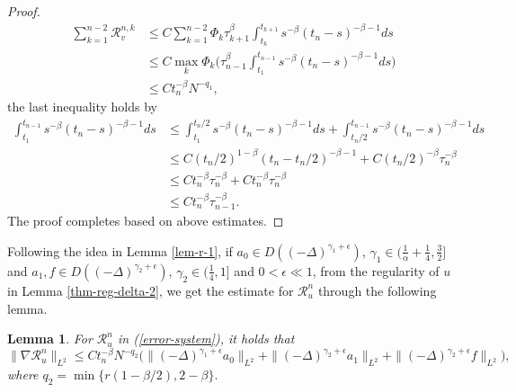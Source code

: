 \documentclass[11pt]{article}
\newtheorem{lemma}{Lemma}[section]
\numberwithin{equation}{section}
\begin{document}
\begin{proof}
\begin{align*}
\sum_{k=1}^{n-2}\mathcal{R}_v^{n,k}
&\le C\sum_{k=1}^{n-2}\Phi_k\tau_{k+1}^\beta \int_{t_k}^{t_{k+1}}s^{-\beta}(t_n-s)^{-\beta-1}ds\\
&\le C\max_k\Phi_k\bigg(\tau_{n-1}^\beta \int_{t_1}^{t_{n-1}}s^{-\beta}(t_n-s)^{-\beta-1}ds\bigg)\\
&\le Ct_n^{-\beta}N^{-q_1},
\end{align*}
the last inequality holds by
\begin{align*}
\int_{t_1}^{t_{n-1}}s^{-\beta}(t_n-s)^{-\beta-1}ds
&\le \int_{t_1}^{t_{n}/2}s^{-\beta}(t_n-s)^{-\beta-1}ds+\int_{t_{n}/2}^{t_{n-1}}s^{-\beta}(t_n-s)^{-\beta-1}ds\\
&\le C(t_n/2)^{1-\beta}(t_n-t_n/2)^{-\beta-1}+C(t_n/2)^{-\beta}\tau_n^{-\beta}\\
&\le Ct_n^{-\beta}\tau_n^{-\beta}+Ct_n^{-\beta}\tau_n^{-\beta}\\
&\le Ct_n^{-\beta}\tau_{n-1}^{-\beta}.
\end{align*}
The proof completes based on above estimates.
\end{proof}

Following the idea in Lemma \ref{lem-r-1}, if $a_0\in D((-\Delta)^{\gamma_1+\epsilon})$, $\gamma_1\in(\frac{1}{\alpha}+\frac14,\frac32]$ and $a_1,f\in D((-\Delta)^{\gamma_2+\epsilon})$, $\gamma_2\in(\frac{1}{4},1]$ and $0<\epsilon \ll 1$, from the regularity of $u$ in Lemma \ref{thm-reg-delta-2}, we get the estimate for $\mathcal{R}_u^n$ through the following lemma.
\begin{lemma}\label{lem-r-2}
For $\mathcal{R}_u^n$ in (\ref{error-system}), it holds that
\[
\|\nabla \mathcal{R}_u^n\|_{L^2} \le Ct_n^{-\beta}N^{-q_2}\Big(\|(-\Delta)^{\gamma_1+\epsilon}a_0\|_{L^2}
+\|(-\Delta)^{\gamma_2+\epsilon}a_1\|_{L^2}+\|(-\Delta)^{\gamma_2+\epsilon}f\|_{L^2}\Big),
\]
where $q_2=\min\{r(1-\beta/2),2-\beta\}.$
\end{lemma}
\end{document}
